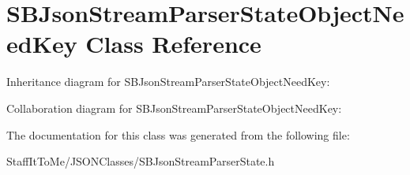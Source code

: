\hypertarget{interface_s_b_json_stream_parser_state_object_need_key}{
\section{\-S\-B\-Json\-Stream\-Parser\-State\-Object\-Need\-Key \-Class \-Reference}
\label{interface_s_b_json_stream_parser_state_object_need_key}
}


\-Inheritance diagram for \-S\-B\-Json\-Stream\-Parser\-State\-Object\-Need\-Key\-:


\-Collaboration diagram for \-S\-B\-Json\-Stream\-Parser\-State\-Object\-Need\-Key\-:


\-The documentation for this class was generated from the following file\-:\begin{DoxyCompactItemize}
\item 
\-Staff\-It\-To\-Me/\-J\-S\-O\-N\-Classes/\-S\-B\-Json\-Stream\-Parser\-State.\-h\end{DoxyCompactItemize}
